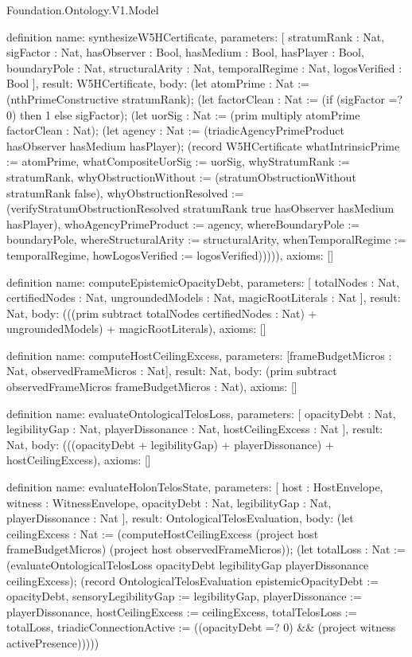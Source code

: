 \begin{lexlean}{Foundation.Ontology.V1.Model}
\begin{semanticmodule}
definition{
  name: synthesizeW5HCertificate,
  parameters: [
    stratumRank : Nat,
    sigFactor : Nat,
    hasObserver : Bool,
    hasMedium : Bool,
    hasPlayer : Bool,
    boundaryPole : Nat,
    structuralArity : Nat,
    temporalRegime : Nat,
    logosVerified : Bool
  ],
  result: W5HCertificate,
  body: (let atomPrime : Nat := (nthPrimeConstructive stratumRank); (let factorClean : Nat := (if (sigFactor =? 0) then 1 else sigFactor); (let uorSig : Nat := (prim multiply atomPrime factorClean : Nat); (let agency : Nat := (triadicAgencyPrimeProduct hasObserver hasMedium hasPlayer); (record W5HCertificate {whatIntrinsicPrime := atomPrime, whatCompositeUorSig := uorSig, whyStratumRank := stratumRank, whyObstructionWithout := (stratumObstructionWithout stratumRank false), whyObstructionResolved := (verifyStratumObstructionResolved stratumRank true hasObserver hasMedium hasPlayer), whoAgencyPrimeProduct := agency, whereBoundaryPole := boundaryPole, whereStructuralArity := structuralArity, whenTemporalRegime := temporalRegime, howLogosVerified := logosVerified}))))),
  axioms: []
}

definition{
  name: computeEpistemicOpacityDebt,
  parameters: [
    totalNodes : Nat,
    certifiedNodes : Nat,
    ungroundedModels : Nat,
    magicRootLiterals : Nat
  ],
  result: Nat,
  body: (((prim subtract totalNodes certifiedNodes : Nat) + ungroundedModels) + magicRootLiterals),
  axioms: []
}

definition{
  name: computeHostCeilingExcess,
  parameters: [frameBudgetMicros : Nat, observedFrameMicros : Nat],
  result: Nat,
  body: (prim subtract observedFrameMicros frameBudgetMicros : Nat),
  axioms: []
}

definition{
  name: evaluateOntologicalTelosLoss,
  parameters: [
    opacityDebt : Nat,
    legibilityGap : Nat,
    playerDissonance : Nat,
    hostCeilingExcess : Nat
  ],
  result: Nat,
  body: (((opacityDebt + legibilityGap) + playerDissonance) + hostCeilingExcess),
  axioms: []
}

definition{
  name: evaluateHolonTelosState,
  parameters: [
    host : HostEnvelope,
    witness : WitnessEnvelope,
    opacityDebt : Nat,
    legibilityGap : Nat,
    playerDissonance : Nat
  ],
  result: OntologicalTelosEvaluation,
  body: (let ceilingExcess : Nat := (computeHostCeilingExcess (project host frameBudgetMicros) (project host observedFrameMicros)); (let totalLoss : Nat := (evaluateOntologicalTelosLoss opacityDebt legibilityGap playerDissonance ceilingExcess); (record OntologicalTelosEvaluation {epistemicOpacityDebt := opacityDebt, sensoryLegibilityGap := legibilityGap, playerDissonance := playerDissonance, hostCeilingExcess := ceilingExcess, totalTelosLoss := totalLoss, triadicConnectionActive := ((opacityDebt =? 0) && (project witness activePresence))})))
}


\end{semanticmodule}
\end{lexlean}
